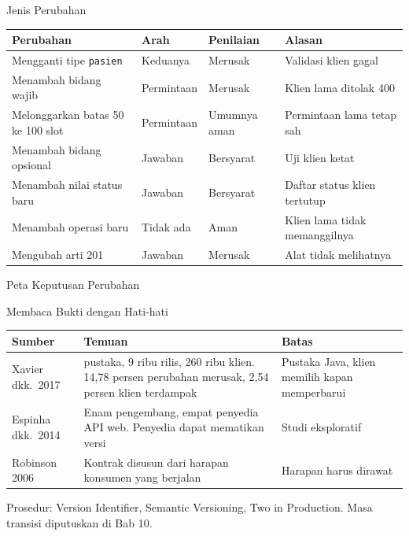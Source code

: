 \documentclass[aspectratio=169, table, 12pt]{beamer}
\begin{document}
\begin{frame}{{\Large Jenis Perubahan}}
  \scriptsize
  \begin{tabularx}{\textwidth}{>{\raggedright\arraybackslash}X >{\raggedright\arraybackslash}p{1.7cm} >{\raggedright\arraybackslash}p{2.1cm} >{\raggedright\arraybackslash}X}
    \hline
    \textbf{Perubahan} & \textbf{Arah} & \textbf{Penilaian} & \textbf{Alasan} \\ \hline
    Mengganti tipe \texttt{pasien} & Keduanya & Merusak & Validasi klien gagal \\ \hline
    Menambah bidang wajib & Permintaan & Merusak & Klien lama ditolak 400 \\ \hline
    Melonggarkan batas 50 ke 100 slot & Permintaan & Umumnya aman & Permintaan lama tetap sah \\ \hline
    Menambah bidang opsional & Jawaban & Bersyarat & Uji klien ketat \\ \hline
    Menambah nilai status baru & Jawaban & Bersyarat & Daftar status klien tertutup \\ \hline
    Menambah operasi baru & Tidak ada & Aman & Klien lama tidak memanggilnya \\ \hline
    Mengubah arti 201 & Jawaban & Merusak & Alat tidak melihatnya \\ \hline
  \end{tabularx}
\end{frame}

\begin{frame}{{\Large Peta Keputusan Perubahan}}
  \centering
\end{frame}

\begin{frame}{{\Large Membaca Bukti dengan Hati-hati}}
  \footnotesize
  \begin{tabularx}{\textwidth}{>{\raggedright\arraybackslash}p{2.8cm} >{\raggedright\arraybackslash}X >{\raggedright\arraybackslash}p{3.8cm}}
    \hline
    \textbf{Sumber} & \textbf{Temuan} & \textbf{Batas} \\ \hline
    Xavier dkk.\ 2017 & 317 pustaka, 9 ribu rilis, 260 ribu klien. 14,78 persen perubahan merusak, 2,54 persen klien terdampak & Pustaka Java, klien memilih kapan memperbarui \\ \hline
    Espinha dkk.\ 2014 & Enam pengembang, empat penyedia API web. Penyedia dapat mematikan versi & Studi eksploratif \\ \hline
    Robinson 2006 & Kontrak disusun dari harapan konsumen yang berjalan & Harapan harus dirawat \\ \hline
  \end{tabularx}

  \vspace{8pt}
  \small Prosedur: Version Identifier, Semantic Versioning, Two in Production. Masa transisi diputuskan di Bab 10.
\end{frame}
\end{document}
